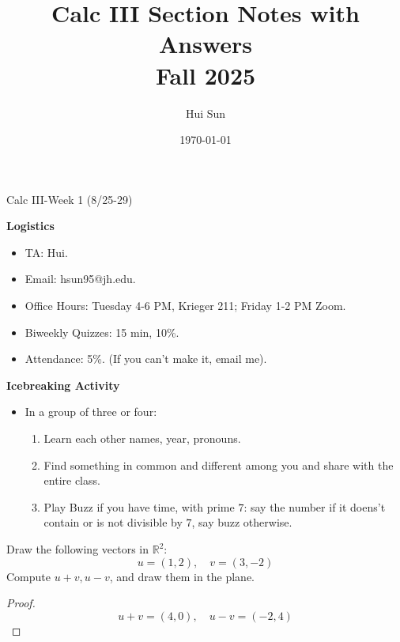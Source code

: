 \documentclass[openany]{book}
\title{Calc III Section Notes with Answers
\\ 
\vspace{0.4cm}
\large Fall 2025}
\date{\today}
\author{Hui Sun}
\newcommand{\R}{\mathbb{R}}
\begin{document}
\maketitle

\newpage


\begin{center}
    \Large Calc III-Week 1 (8/25-29)
\end{center}

\renewcommand\thesection{\arabic{section}}
\noindent
\textbf{Logistics}


\begin{itemize}
    \item TA: Hui.
    \item Email: hsun95@jh.edu.
    \item Office Hours: Tuesday 4-6 PM, Krieger 211; Friday 1-2 PM Zoom.
    \item Biweekly Quizzes: 15 min, 10\%.
    \item Attendance: 5\%. (If you can't make it, email me).
\end{itemize}

\noindent
\textbf{Icebreaking Activity}

\begin{itemize}
    \item In a group of three or four: 
    \begin{enumerate}
        \item Learn each other names, year, pronouns.
        \item Find something in common and different among you and share with the entire class.
        \item Play Buzz if you have time, with prime $7$: say the number if it doens't contain or is not divisible by $7$, say buzz otherwise.
    \end{enumerate}
\end{itemize}


\begin{prob}
    Draw the following vectors in $\R^2$:
    \begin{equation*}
        u=(1,2), \quad v=(3,-2)
    \end{equation*}
    Compute $u+v, u-v$, and draw them in the plane.
\end{prob}
\begin{proof}
    \begin{equation*}
        u+v=(4,0), \quad u-v=(-2, 4)
    \end{equation*}
\end{proof}
\end{document}
